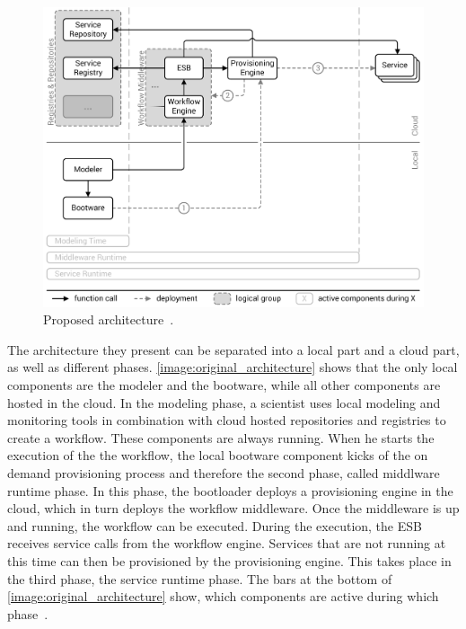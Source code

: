 \begin{figure}[!htbp]
	\centering
	\includegraphics[resolution=600]{previous/assets/original_architecture}
	\caption{Proposed architecture~\autocite[based on][]{provisioning:ondemand}.}
	\label{image:original_architecture}
\end{figure}

The architecture they present can be separated into a local part and a cloud part, as well as different phases.
\autoref{image:original_architecture} shows that the only local components are the modeler and the bootware, while all other components are hosted in the cloud.
In the modeling phase, a scientist uses local modeling and monitoring tools in combination with cloud hosted repositories and registries to create a workflow.
These components are always running.
When he starts the execution of the the workflow, the local bootware component kicks of the on demand provisioning process and therefore the second phase, called middlware runtime phase.
In this phase, the bootloader deploys a provisioning engine in the cloud, which in turn deploys the workflow middleware.
Once the middleware is up and running, the workflow can be executed. During the execution, the ESB receives service calls from the workflow engine.
Services that are not running at this time can then be provisioned by the provisioning engine.
This takes place in the third phase, the service runtime phase.
The bars at the bottom of \autoref{image:original_architecture} show, which components are active during which phase~\autocite{provisioning:ondemand}.

